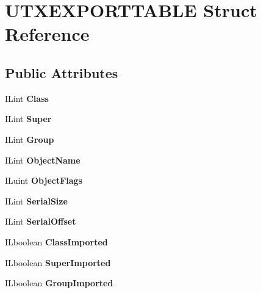 \hypertarget{structUTXEXPORTTABLE}{}\section{U\+T\+X\+E\+X\+P\+O\+R\+T\+T\+A\+B\+LE Struct Reference}
\label{structUTXEXPORTTABLE}
\subsection*{Public Attributes}
\begin{DoxyCompactItemize}
\item 
\mbox{\label{structUTXEXPORTTABLE_ae3387681d70884910e58db851a1c5d05}} 
I\+Lint {\bfseries Class}
\item 
\mbox{\label{structUTXEXPORTTABLE_ae4b843e5bd8e1ca96db3a8bd9f6594f0}} 
I\+Lint {\bfseries Super}
\item 
\mbox{\label{structUTXEXPORTTABLE_af959f7b8e84cb94b6562fcd9207ad97d}} 
I\+Lint {\bfseries Group}
\item 
\mbox{\label{structUTXEXPORTTABLE_a1f54d2e99f2921c1aaa6f26ab7e9dc97}} 
I\+Lint {\bfseries Object\+Name}
\item 
\mbox{\label{structUTXEXPORTTABLE_ac8e40bbb27319890f9e267d159700f51}} 
I\+Luint {\bfseries Object\+Flags}
\item 
\mbox{\label{structUTXEXPORTTABLE_aaa7c1b9388d7481f31e72507da679a13}} 
I\+Lint {\bfseries Serial\+Size}
\item 
\mbox{\label{structUTXEXPORTTABLE_a8ef3ba94465b6581e689b92db441fab9}} 
I\+Lint {\bfseries Serial\+Offset}
\item 
\mbox{\label{structUTXEXPORTTABLE_a3c8f927a2dc6a3f4e62d1d9ed17eea24}} 
I\+Lboolean {\bfseries Class\+Imported}
\item 
\mbox{\label{structUTXEXPORTTABLE_afbee0655b6fd084f6d3389c07da1d289}} 
I\+Lboolean {\bfseries Super\+Imported}
\item 
\mbox{\label{structUTXEXPORTTABLE_ab1e3b50406f528db21d9e6640e0db2fa}} 
I\+Lboolean {\bfseries Group\+Imported}
\end{DoxyCompactItemize}


